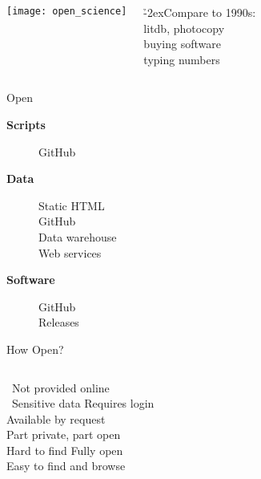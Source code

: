 \documentclass[aspectratio=169]{beamer}
\begin{document}
\begin{frame}
  \begin{columns}[T]
    \vspace{-5ex}
    \begin{center}
      \texttt{[image: open\_science]}
    \end{center}
    \vspace{41ex}
    \tiny\gray
    \h{-2ex}Compare to 1990s:\\[1ex]
    litdb, photocopy\\[0.5ex]
    buying software\\[0.5ex]
    typing numbers
  \end{columns}
\end{frame}


\begin{frame}{Open}
  \begin{description}
    \item[\bf Scripts~] GitHub\\[5ex]
    \item[\bf Data~] Static HTML\\[0.5ex]
    GitHub\\[0.55ex]
    Data warehouse\\[0.5ex]
    Web services\\[5ex]
    \item[\bf Software~] GitHub\\[0.5ex]
    Releases\\[3ex]
  \end{description}
\end{frame}


\begin{frame}{How Open?}
  \begin{columns}[T]
    \darkgray
    ~Not provided online\\[1ex]
    ~Sensitive data
    \darkgreen
    Requires login\\[1ex]
    Available by request\\[1ex]
    Part private, part open\\[1ex]
    Hard to find
    \green
    Fully open\\[0.5ex]
    Easy to find and browse
  \end{columns}
\end{frame}
\end{document}
